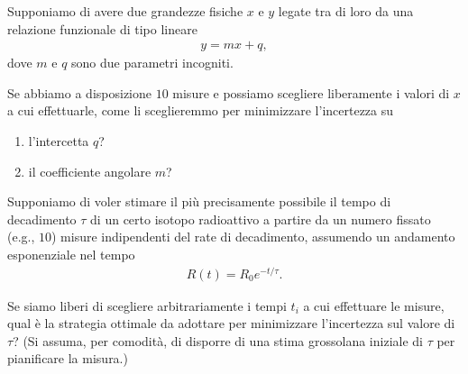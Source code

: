 \begin{solution}


\end{solution}



\begin{exercise}

Supponiamo di avere due grandezze fisiche $x$ e $y$ legate tra di loro da una
relazione funzionale di tipo lineare
\begin{align*}
  y = m x + q,
\end{align*}
dove $m$ e $q$ sono due parametri incogniti.

Se abbiamo a disposizione $10$ misure e possiamo scegliere liberamente i valori
di $x$ a cui effettuarle, come li sceglieremmo per minimizzare l'incertezza
su
\begin{enumerate}
    \item l'intercetta $q$?
    \item il coefficiente angolare $m$?
\end{enumerate}

\end{exercise}


\begin{solution}


\end{solution}



\begin{exercise}

Supponiamo di voler stimare il pi\`u precisamente possibile il tempo di decadimento
$\tau$ di un certo isotopo radioattivo a partire da un numero fissato (e.g., $10$)
misure indipendenti del rate  di decadimento, assumendo un andamento
esponenziale nel tempo
\begin{align*}
  R(t) = R_0 e^{-t/\tau}.
\end{align*}

Se siamo liberi di scegliere arbitrariamente i tempi $t_i$ a cui effettuare le
misure, qual \`e la strategia ottimale da adottare per minimizzare l'incertezza
sul valore di $\tau$? (Si assuma, per comodit\`a, di disporre di una stima
grossolana iniziale di $\tau$ per pianificare la misura.)

\end{exercise}


\begin{solution}


\end{solution}